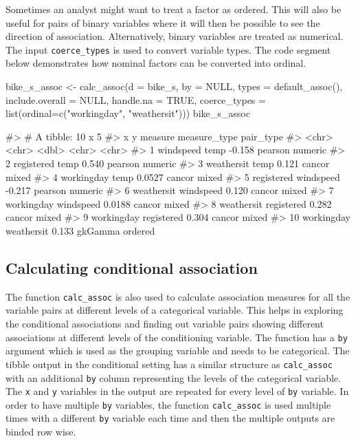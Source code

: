 Sometimes an analyst might want to treat a factor as ordered. This will
also be useful for pairs of binary variables where it will then be
possible to see the direction of association. Alternatively, binary
variables are treated as numerical. The input \texttt{coerce\_types} is
used to convert variable types. The code segment below demonstrates how
nominal factors can be converted into ordinal.

\begin{Schunk}
\begin{Sinput}
bike_s_assoc <- calc_assoc(d = bike_s,
                           by = NULL,
                           types = default_assoc(),
                           include.overall = NULL,
                           handle.na = TRUE,
                           coerce_types = list(ordinal=c("workingday", "weathersit")))
bike_s_assoc
\end{Sinput}
\begin{Soutput}
#> # A tibble: 10 x 5
#>    x          y          measure measure_type pair_type
#>    <chr>      <chr>        <dbl> <chr>        <chr>    
#>  1 windspeed  temp       -0.158  pearson      numeric  
#>  2 registered temp        0.540  pearson      numeric  
#>  3 weathersit temp        0.121  cancor       mixed    
#>  4 workingday temp        0.0527 cancor       mixed    
#>  5 registered windspeed  -0.217  pearson      numeric  
#>  6 weathersit windspeed   0.120  cancor       mixed    
#>  7 workingday windspeed   0.0188 cancor       mixed    
#>  8 weathersit registered  0.282  cancor       mixed    
#>  9 workingday registered  0.304  cancor       mixed    
#> 10 workingday weathersit  0.133  gkGamma      ordered
\end{Soutput}
\end{Schunk}

\hypertarget{calculating-conditional-association}{%
\subsection{Calculating conditional
association}\label{calculating-conditional-association}}

The function \texttt{calc\_assoc} is also used to calculate association
measures for all the variable pairs at different levels of a categorical
variable. This helps in exploring the conditional associations and
finding out variable pairs showing different associations at different
levels of the conditioning variable. The function has a \texttt{by}
argument which is used as the grouping variable and needs to be
categorical. The tibble output in the conditional setting has a similar
structure as \texttt{calc\_assoc} with an additional \texttt{by} column
representing the levels of the categorical variable. The \texttt{x} and
\texttt{y} variables in the output are repeated for every level of
\texttt{by} variable. In order to have multiple \texttt{by} variables,
the function \texttt{calc\_assoc} is used multiple times with a
different \texttt{by} variable each time and then the multiple outputs
are binded row wise.

